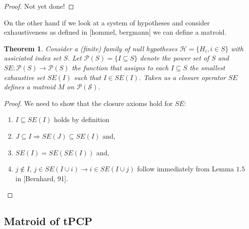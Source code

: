 \documentclass[a4paper,12pt]{article}
\newtheorem{theorem}{Theorem}
\newtheorem{comment}{Comment}
\begin{document}
\begin{proof}
  Not yet done!
\end{proof}

\begin{comment}
  Above restriction (\ref{cond:matroid2}), already for the simple case
  of $|J|=1$, is no longer a statment about the parallels of
  $M$. 
\end{comment}



On the other hand if we look at a system of hypotheses and consider
exhaustiveness as defined in [hommel, bergmann] we can define a
matroid. 

\begin{theorem}
\label{the:matroid}
  Consider a (finite) family of null hypotheses $\mathcal{H} = \{H_i,
  i \in S\}$ with assiciated index set $S$. Let $\mathcal{P}(S) = \{I
  \subseteq S\}$ denote the power set of $S$ and $SE:\mathcal{P}(S)
  \rightarrow \mathcal{P}(S)$ the function that assigns to each $I
  \subseteq S$ the smallest exhaustive set $SE(I)$ such that $I \in
  SE(I)$. Taken as a closure operator $SE$ defines a matroid $M$ on
  $\mathcal{P(S)}$.
\end{theorem}

\begin{proof}
  We need to show that the closure axioms hold for $SE$:
  \begin{enumerate}
  \item $I \subseteq SE(I)$ holds by definition
  \item $J \subseteq I \Rightarrow SE(J) \subseteq SE(I)$ and,
  \item $SE(I) = SE(SE(I))$ and,
  \item $j \notin I$, $j \in SE(I \cup i) \rightarrow i \in SE(I \cup
    j)$ follow immediately from Lemma $1.5$ in [Bernhard, 91].
  \end{enumerate}
\end{proof}

\subsection{Matroid of tPCP}
\end{document}
